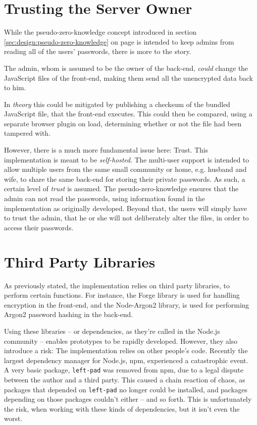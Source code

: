 	\section{Trusting the Server Owner}
		While the pseudo-zero-knowledge concept introduced in section \ref{sec:design:pseudo-zero-knowledge} on page \pageref{sec:design:pseudo-zero-knowledge} is intended to keep admins from reading all of the users' passwords, there is more to the story.

		The admin, whom is assumed to be the owner of the back-end, \emph{could} change the JavaScript files of the front-end, making them send all the unencrypted data back to him. 

		In \emph{theory} this could be mitigated by publishing a checksum of the bundled JavaScript file, that the front-end executes. This could then be compared, using a separate browser plugin on load, determining whether or not the file had been tampered with.

		However, there is a much more fundamental issue here: Trust. This implementation is meant to be \emph{self-hosted}. The multi-user support is intended to allow multiple users from the same small community or home, e.g. husband and wife, to share the same back-end for storing their private passwords. As such, a certain level of \emph{trust} is assumed. The pseudo-zero-knowledge ensures that the admin can not read the passwords, using information found in the implementation as originally developed. Beyond that, the users will simply have to trust the admin, that he or she will not deliberately alter the files, in order to access their passwords.

	\section{Third Party Libraries}
		As previously stated, the implementation relies on third party libraries, to perform certain functions. For instance, the Forge library is used for handling encryption in the front-end, and the Node-Argon2 library, is used for performing Argon2 password hashing in the back-end. 

		Using these libraries -- or dependencies, as they're called in the Node.js community -- enables prototypes to be rapidly developed. However, they also introduce a risk: The implementation relies on other people's code. Recently the largest dependency manager for Node.js, npm, experienced a catastrophic event. A very basic package, \verb=left-pad= was removed from npm, due to a legal dispute between the author and a third party\cite{npm_leftpad}. This caused a chain reaction of chaos, as packages that depended on \verb=left-pad= no longer could be installed, and packages depending on those packages couldn't either -- and so forth. This is unfortunately the risk, when working with these kinds of dependencies, but it isn't even the worst.

